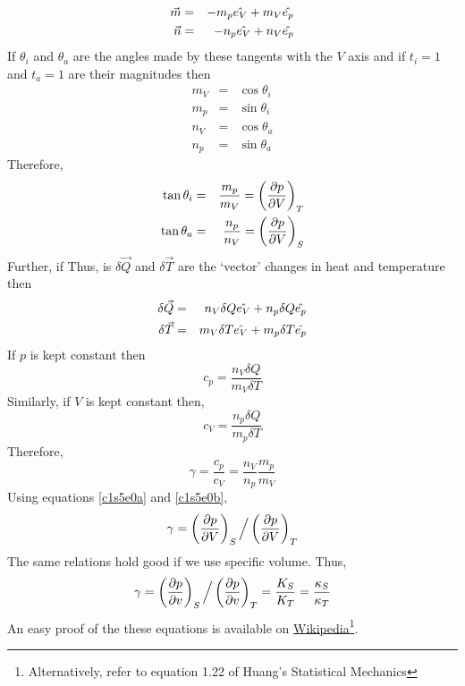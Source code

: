 \begin{eqnarray*}
\vec{m} &=& -m_p\hat{e_{V}} + m_V\hat{e_{p}} \\
\vec{n} &=& -n_p\hat{e_{V}} + n_V\hat{e_{p}}
\end{eqnarray*}
If $\theta_i$ and $\theta_a$ are the angles made by these tangents with the $V$ axis and if $t_i = 1$ and $t_a = 1$ are their magnitudes then
\begin{eqnarray*}
m_V &=& \cos\theta_i \\
m_p  &=& \sin\theta_i \\
n_V &=& \cos\theta_a \\
n_p  &=& \sin\theta_a
\end{eqnarray*}
Therefore,
\begin{eqnarray}
\tan\theta_i &=& \frac{m_p}{m_V} = \left(\frac{\partial{p}}{\partial{V}}\right)_T \label{c1s5e0a} \\
\tan\theta_a &=& \frac{n_p}{n_V} = \left(\frac{\partial{p}}{\partial{V}}\right)_S \label{c1s5e0b} 
\end{eqnarray}
Further, if 
Thus, is $\delta\vec{Q}$ and $\delta\vec{T}$ are the \enquote*{vector} changes in heat and temperature then
\begin{eqnarray*}
\delta\vec{Q} &=& n_V\delta Q\hat{e_{V}} + n_p\delta Q\hat{e_{p}} \\
\delta\vec{T} &=& m_V\delta T\hat{e_{V}} + m_p\delta T\hat{e_{p}}
\end{eqnarray*}
If $p$ is kept constant then
\[
c_p = \frac{n_V \delta Q}{m_V \delta T} 
\]
Similarly, if $V$ is kept constant then,
\[
c_V = \frac{n_p \delta Q}{m_p \delta T} 
\]
Therefore,
\[
\gamma = \frac{c_p}{c_V} = \frac{n_V}{n_p}\frac{m_p}{m_V}
\]
Using equations \eqref{c1s5e0a} and \eqref{c1s5e0b},
\[
\gamma = \left(\frac{\partial{p}}{\partial{V}}\right)_S \Big/ \left(\frac{\partial{p}}{\partial{V}}\right)_T
\]
The same relations hold good if we use specific volume. Thus,
\[
\gamma = \left(\frac{\partial{p}}{\partial{v}}\right)_S \Big/ \left(\frac{\partial{p}}{\partial{v}}\right)_T = \frac{K_S}{K_T} = \frac{\kappa_S}{\kappa_T}
\]
An easy proof of the these equations is available on \href{https://en.wikipedia.org/wiki/Relations_between_heat_capacities}{Wikipedia}\footnote{Alternatively, refer to equation 1.22 of
Huang's Statistical Mechanics\cite{huang1987statistical}}.

